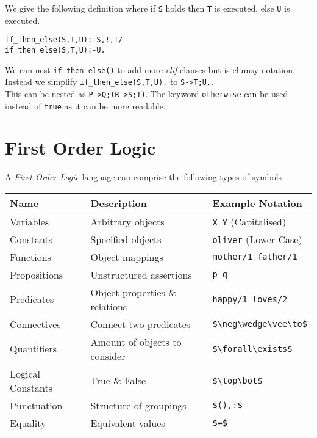 \documentclass[11pt,a4paper]{article}
\begin{document}
We give the following definition where if \lstinline!S! holds then \lstinline!T! is executed, else \lstinline!U! is executed.
\begin{lstlisting}
if_then_else(S,T,U):-S,!,T/
if_then_else(S,T,U):-U.
\end{lstlisting}

We can nest \lstinline!if_then_else()! to add more \textit{elif} clauses but is clumsy notation.\\
Instead we simplify \lstinline!if_then_else(S,T,U).! to \lstinline!S->T;U.!.\\
This can be nested as \lstinline!P->Q;(R->S;T)!. The keyword \lstinline!otherwise! can be used instead of \lstinline!true! as it can be more readable.


\newpage
\setcounter{section}{-1}
\section{First Order Logic}

A \textit{First Order Logic} language can comprise the following types of symbols
\begin{center}
\begin{tabular}{l|l|l}
\textbf{Name}&\textbf{Description}&\textbf{Example Notation}\\\hline
Variables&Arbitrary objects&\lstinline!X Y! (Capitalised)\\
Constants&Specified objects&\lstinline!oliver! (Lower Case)\\
Functions&Object mappings&\lstinline!mother/1 father/1!\\
Propositions&Unstructured assertions&\lstinline!p q!\\
Predicates&Object properties \& relations&\lstinline!happy/1 loves/2!\\
Connectives&Connect two predicates&\lstinline!$\neg\wedge\vee\to$!\\
Quantifiers&Amount of objects to consider&\lstinline!$\forall\exists$!\\
Logical Constants&True \& False&\lstinline!$\top\bot$!\\
Punctuation&Structure of groupings&\lstinline!$(),:$!\\
Equality&Equivalent values&\lstinline!$=$!
\end{tabular}
\end{center}
\end{document}
